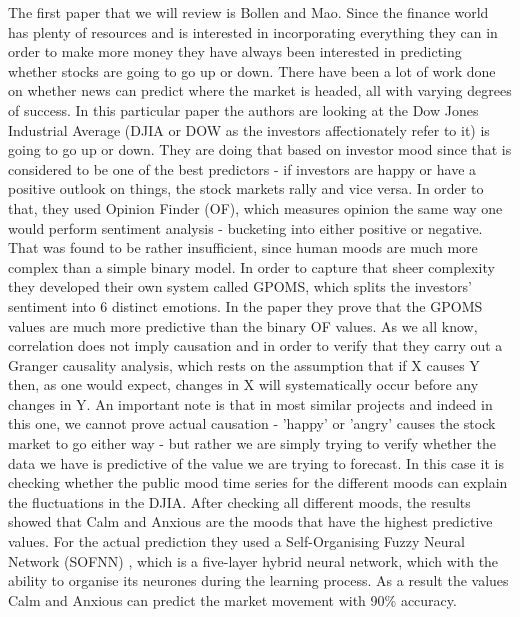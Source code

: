 \documentclass[minf,twoside,singlespacing,parskip,frontabs,notimes,12pt]{infthesis} %
\begin{document}
The first paper that we will review is Bollen and Mao\cite{twitstock}. Since the finance world has plenty of resources and is interested in incorporating everything they can in order to make more money they have always been interested in predicting whether stocks are going to go up or down. There have been a lot of work done on whether news can predict where the market is headed, all with varying degrees of success. In this particular paper the authors are looking at the Dow Jones Industrial Average \cite{dija} (DJIA or DOW as the investors affectionately refer to it) is going to go up or down. They are doing that based on investor mood since that is considered to be  one of the best predictors - if investors are happy or have a positive outlook on things, the stock markets rally and vice versa. In order to that, they used Opinion Finder (OF)\cite{opfind}, which measures opinion the same way one would perform sentiment analysis - bucketing into either positive or negative. That was found to be rather insufficient, since human moods are much more complex than a simple binary model. In order to capture that sheer complexity they developed their own system called GPOMS, which splits the investors' sentiment into 6 distinct emotions. In the paper they prove that the GPOMS values are much more predictive than the binary OF values. As we all know, correlation does not imply causation and in order to verify that they carry out a Granger causality analysis\cite{granger}, which rests on the assumption that if X causes Y then, as one would expect, changes in X will systematically occur before any changes in Y. An important note is that in most similar projects and indeed in this one, we cannot prove actual causation - 'happy' or 'angry' causes the stock market to go either way - but rather we are simply trying to verify whether the data we have is predictive of the value we are trying to forecast. In this case it is checking whether the public mood time series for the different moods can explain the fluctuations in the DJIA. After checking all different moods, the results showed that Calm and Anxious are the moods that have the highest predictive values. For the actual prediction they used a Self-Organising Fuzzy Neural Network (SOFNN) \cite{sofnn}, which is a five-layer hybrid neural network, which with the ability to organise its neurones during the learning process. As a result the values Calm and Anxious can predict the market movement with 90\% accuracy. 
\end{document}

